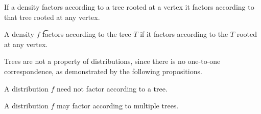 
\begin{prop}
If a density factors according
to a tree rooted at a vertex it
factors according to that tree rooted
at any vertex.
\end{prop}


A density $f$
\t{factors according to the tree} $T$
if it factors according to the
$T$ rooted at any vertex.


Trees are not a property of distributions,
since there is no one-to-one correspondence,
as demonstrated by the following propositions.


A distribution $f$ need not factor according to a tree.

A distribution
$f$ may factor according to multiple trees.
\strats
